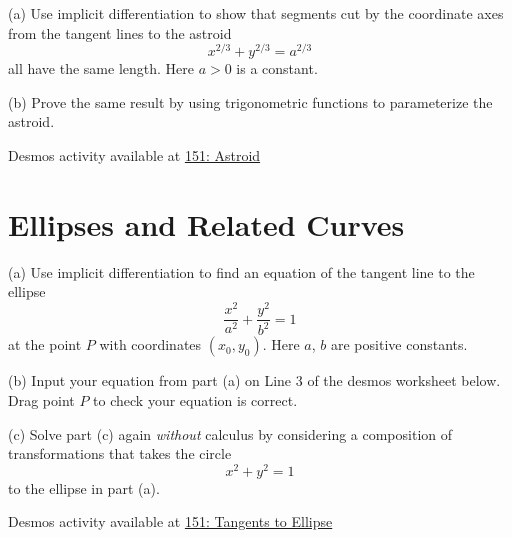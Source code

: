 \documentclass{ximera}
\begin{document}
\begin{question}  \label{Q:LLKKKMM}
(a) Use implicit differentiation to show that segments cut by the coordinate axes from the tangent lines to the astroid
\[
   x^{2/3} + y^{2/3} = a^{2/3}
\]
all have the same length. Here $a>0$ is a constant.

(b) Prove the same result by using trigonometric functions to parameterize the astroid.

\begin{onlineOnly}
    \begin{center}
\end{center}
\end{onlineOnly}

Desmos activity available at \href{https://www.desmos.com/calculator/vrythrvjuc}{151: Astroid}


\end{question}



\section*{Ellipses and Related Curves}

\begin{question}  \label{Q:4bbfdellk}
(a) Use implicit differentiation to find an equation of the tangent line to the ellipse 
\[
   \frac{x^2}{a^2} + \frac{y^2}{b^2} = 1
\]
at the point $P$ with coordinates $(x_0, y_0)$. Here $a$, $b$ are positive constants.

(b) Input your equation from part (a) on Line 3 of the desmos worksheet below. Drag point $P$ to check your equation is correct.

(c) Solve part (c) again \emph{without} calculus by considering a composition of transformations that takes the circle
\[
       x^2 + y^2 = 1
\]
to the ellipse in part (a).

\begin{onlineOnly}
    \begin{center}
\end{center}
\end{onlineOnly}

Desmos activity available at \href{https://www.desmos.com/calculator/t1e9v7ncpv}{151: Tangents to Ellipse}

\end{question}
\end{document}
